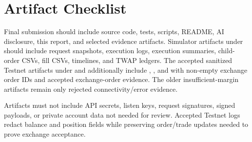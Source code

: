 \section{Artifact Checklist}

Final submission should include source code, tests, scripts, README, AI disclosure, this report, and selected evidence artifacts. Simulator artifacts under  should include request snapshots, execution logs, execution summaries, child-order CSVs, fill CSVs, timelines, and TWAP ledgers. The accepted sanitized Testnet artifacts under  and  additionally include , , and  with non-empty exchange order IDs and accepted exchange-order evidence. The older insufficient-margin artifacts remain only rejected connectivity/error evidence.

Artifacts must not include API secrets, listen keys, request signatures, signed payloads, or private account data not needed for review. Accepted Testnet logs redact  balance and position fields while preserving order/trade updates needed to prove exchange acceptance.
